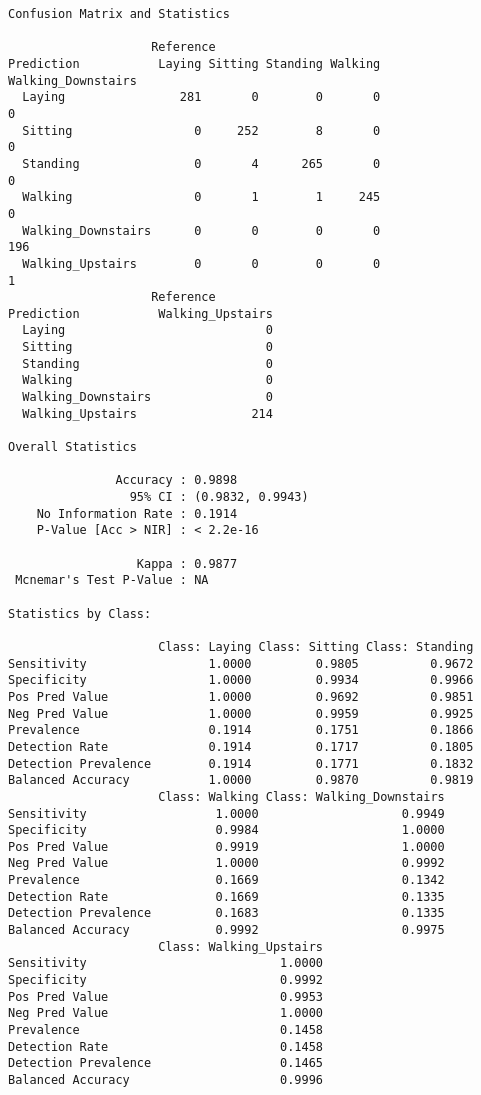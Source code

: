 \documentclass[11pt]{article}
\begin{document}
    
    \begin{verbatim}
Confusion Matrix and Statistics

                    Reference
Prediction           Laying Sitting Standing Walking Walking_Downstairs
  Laying                281       0        0       0                  0
  Sitting                 0     252        8       0                  0
  Standing                0       4      265       0                  0
  Walking                 0       1        1     245                  0
  Walking_Downstairs      0       0        0       0                196
  Walking_Upstairs        0       0        0       0                  1
                    Reference
Prediction           Walking_Upstairs
  Laying                            0
  Sitting                           0
  Standing                          0
  Walking                           0
  Walking_Downstairs                0
  Walking_Upstairs                214

Overall Statistics
                                          
               Accuracy : 0.9898          
                 95% CI : (0.9832, 0.9943)
    No Information Rate : 0.1914          
    P-Value [Acc > NIR] : < 2.2e-16       
                                          
                  Kappa : 0.9877          
 Mcnemar's Test P-Value : NA              

Statistics by Class:

                     Class: Laying Class: Sitting Class: Standing
Sensitivity                 1.0000         0.9805          0.9672
Specificity                 1.0000         0.9934          0.9966
Pos Pred Value              1.0000         0.9692          0.9851
Neg Pred Value              1.0000         0.9959          0.9925
Prevalence                  0.1914         0.1751          0.1866
Detection Rate              0.1914         0.1717          0.1805
Detection Prevalence        0.1914         0.1771          0.1832
Balanced Accuracy           1.0000         0.9870          0.9819
                     Class: Walking Class: Walking_Downstairs
Sensitivity                  1.0000                    0.9949
Specificity                  0.9984                    1.0000
Pos Pred Value               0.9919                    1.0000
Neg Pred Value               1.0000                    0.9992
Prevalence                   0.1669                    0.1342
Detection Rate               0.1669                    0.1335
Detection Prevalence         0.1683                    0.1335
Balanced Accuracy            0.9992                    0.9975
                     Class: Walking_Upstairs
Sensitivity                           1.0000
Specificity                           0.9992
Pos Pred Value                        0.9953
Neg Pred Value                        1.0000
Prevalence                            0.1458
Detection Rate                        0.1458
Detection Prevalence                  0.1465
Balanced Accuracy                     0.9996
    \end{verbatim}
\end{document}

